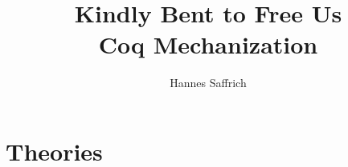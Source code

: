 \documentclass[12pt]{report}
\title{
  Kindly Bent to Free Us \\
  {\large Coq Mechanization}
}
\author{Hannes Saffrich}
\begin{document}
\maketitle

\tableofcontents

\part{Theories}











\clearpage
% 
% 

\end{document}
